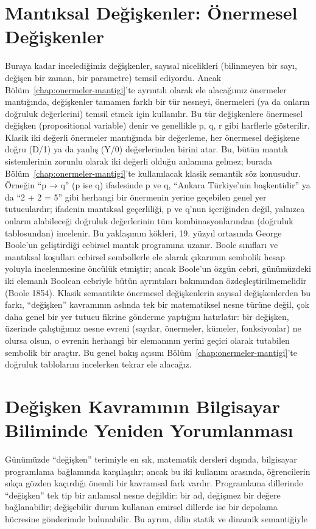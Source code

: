 \section{Mantıksal Değişkenler: Önermesel Değişkenler}

Buraya kadar incelediğimiz değişkenler, sayısal nicelikleri (bilinmeyen bir sayı, değişen bir zaman, bir parametre) temsil ediyordu. Ancak Bölüm~\ref{chap:onermeler-mantigi}’te ayrıntılı olarak ele alacağımız önermeler mantığında, değişkenler tamamen farklı bir tür nesneyi, önermeleri (ya da onların doğruluk değerlerini) temsil etmek için kullanılır. Bu tür değişkenlere önermesel değişken (propositional variable) denir ve genellikle p, q, r gibi harflerle gösterilir. Klasik iki değerli önermeler mantığında bir değerleme, her önermesel değişkene doğru (D/1) ya da yanlış (Y/0) değerlerinden birini atar. Bu, bütün mantık sistemlerinin zorunlu olarak iki değerli olduğu anlamına gelmez; burada Bölüm~\ref{chap:onermeler-mantigi}’te kullanılacak klasik semantik söz konusudur. Örneğin “p → q” (p ise q) ifadesinde p ve q, “Ankara Türkiye’nin başkentidir” ya da “2 + 2 = 5” gibi herhangi bir önermenin yerine geçebilen genel yer tutuculardır; ifadenin mantıksal geçerliliği, p ve q’nun içeriğinden değil, yalnızca onların alabileceği doğruluk değerlerinin tüm kombinasyonlarından (doğruluk tablosundan) incelenir. Bu yaklaşımın kökleri, 19. yüzyıl ortasında George Boole’un geliştirdiği cebirsel mantık programına uzanır. Boole sınıfları ve mantıksal koşulları cebirsel sembollerle ele alarak çıkarımın sembolik hesap yoluyla incelenmesine öncülük etmiştir; ancak Boole’un özgün cebri, günümüzdeki iki elemanlı Boolean cebriyle bütün ayrıntıları bakımından özdeşleştirilmemelidir (Boole 1854). Klasik semantikte önermesel değişkenlerin sayısal değişkenlerden bu farkı, “değişken” kavramının aslında tek bir matematiksel nesne türüne değil, çok daha genel bir yer tutucu fikrine gönderme yaptığını hatırlatır: bir değişken, üzerinde çalıştığımız nesne evreni (sayılar, önermeler, kümeler, fonksiyonlar) ne olursa olsun, o evrenin herhangi bir elemanının yerini geçici olarak tutabilen sembolik bir araçtır. Bu genel bakış açısını Bölüm~\ref{chap:onermeler-mantigi}’te doğruluk tablolarını incelerken tekrar ele alacağız.

\section{Değişken Kavramının Bilgisayar Biliminde Yeniden Yorumlanması}

Günümüzde “değişken” terimiyle en sık, matematik dersleri dışında, bilgisayar programlama bağlamında karşılaşılır; ancak bu iki kullanım arasında, öğrencilerin sıkça gözden kaçırdığı önemli bir kavramsal fark vardır. Programlama dillerinde “değişken” tek tip bir anlamsal nesne değildir: bir ad, değişmez bir değere bağlanabilir; değişebilir durum kullanan emirsel dillerde ise bir depolama hücresine gönderimde bulunabilir. Bu ayrım, dilin statik ve dinamik semantiğiyle

